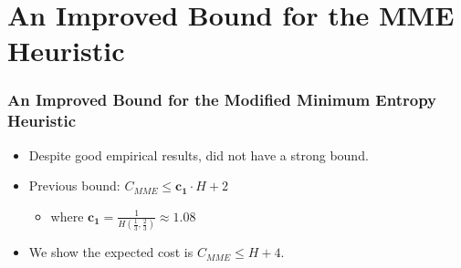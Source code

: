 \documentclass{beamer}
\theoremstyle{plain}
\begin{document}
\section{An Improved Bound for the MME Heuristic}\label{An Improved Bound for the Modified Minimum Entropy Heuristic}

\begin{frame} \frametitle{An Improved Bound for the Modified Minimum Entropy Heuristic}

\begin{itemize}
\item<1-> Despite good empirical results, did not have a strong bound.

\item<2-> Previous bound: $C_{MME} \leq \mathbf{c_1}\cdot H+2$
\begin{itemize}
\item<3-> where $\mathbf{c_1}=\frac{1}{H(\frac{1}{3}, \frac{2}{3})} \approx 1.08$
\end{itemize}

\item<4-> We show the expected cost is $C_{MME} \leq H+4$.
\end{itemize}

\end{frame}
\end{document}
